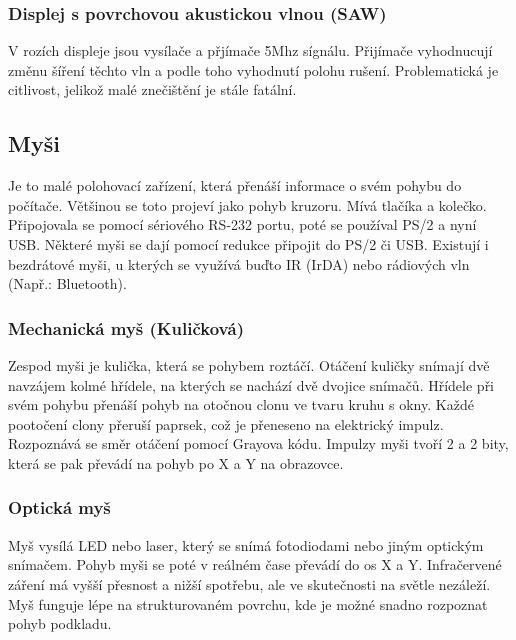 \subsubsection{Displej s povrchovou akustickou vlnou (SAW)}
V rozích displeje jsou vysílače a přjímače 5Mhz sígnálu.
Přijímače vyhodnucují změnu šíření těchto vln a podle toho vyhodnutí polohu rušení.
Problematická je citlivost, jelikož malé znečištění je stále fatální.
\subsection{Myši}
Je to malé polohovací zařízení, která přenáší informace o svém pohybu do počítače.
Většinou se toto projeví jako pohyb kruzoru.
Mívá tlačíka a kolečko.
Připojovala se pomocí sériového RS-232 portu, poté se používal PS/2 a nyní USB.
Některé myši se dají pomocí redukce připojit do PS/2 či USB.
Existují i bezdrátové myši, u kterých se využívá buďto IR (IrDA) nebo rádiových vln (Např.: Bluetooth).
\subsubsection{Mechanická myš (Kuličková)}
Zespod myši je kulička, která se pohybem roztáčí.
Otáčení kuličky snímají dvě navzájem kolmé hřídele, na kterých se nachází dvě dvojice snímačů.
Hřídele při svém pohybu přenáší pohyb na otočnou clonu ve tvaru kruhu s okny.
Každé pootočení clony přeruší paprsek, což je přeneseno na elektrický impulz.
Rozpoznává se směr otáčení pomocí Grayova kódu.
Impulzy myši tvoří 2 a 2 bity, která se pak převádí na pohyb po X a Y na obrazovce.
\subsubsection{Optická myš}
Myš vysílá LED nebo laser, který se snímá fotodiodami nebo jiným optickým snímačem.
Pohyb myši se poté v reálném čase převádí do os X a Y.
Infračervené záření má vyšší přesnost a nižší spotřebu, ale ve skutečnosti na světle nezáleží.
Myš funguje lépe na strukturovaném povrchu, kde je možné snadno rozpoznat pohyb podkladu.
